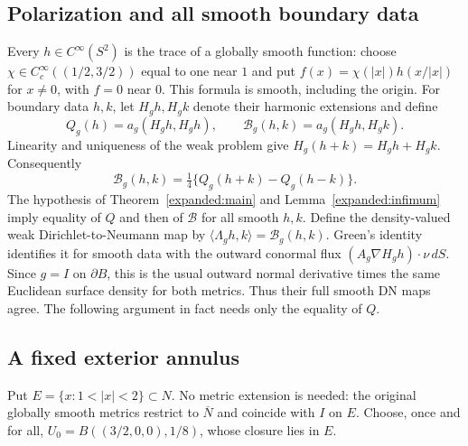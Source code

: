 \documentclass[11pt]{article}
\theoremstyle{definition}
\theoremstyle{remark}
\numberwithin{equation}{section}
\begin{document}
\subsection{Polarization and all smooth boundary data}
Every $h\in C^\infty(S^2)$ is the trace of a globally smooth function:
choose $\chi\in C_c^\infty((1/2,3/2))$ equal to one near $1$ and put
$f(x)=\chi(|x|)h(x/|x|)$ for $x\ne0$, with $f=0$ near $0$.
This formula is smooth, including the origin. For boundary data $h,k$,
let $H_gh,H_gk$ denote their harmonic extensions and define
\[
 Q_g(h)=a_g(H_gh,H_gh),\qquad
 \mathcal B_g(h,k)=a_g(H_gh,H_gk).
\]
Linearity and uniqueness of the weak problem give
$H_g(h+k)=H_gh+H_gk$. Consequently
\begin{equation}\label{expanded:polarization}
 \mathcal B_g(h,k)=\tfrac14\{Q_g(h+k)-Q_g(h-k)\}.
\end{equation}
The hypothesis of Theorem~\ref{expanded:main} and
Lemma~\ref{expanded:infimum} imply equality of $Q$ and then of
$\mathcal B$ for all smooth $h,k$. Define the density-valued weak
Dirichlet-to-Neumann map by
$\langle\Lambda_gh,k\rangle=\mathcal B_g(h,k)$.
Green's identity identifies it for smooth data with the outward conormal
flux $(A_g\nabla H_gh)\cdot\nu\,dS$. Since $g=I$ on $\partial B$,
this is the usual outward normal derivative times the same Euclidean
surface density for both metrics. Thus their full smooth DN maps agree.
The following argument in fact needs only the equality of $Q$.

\subsection{A fixed exterior annulus}\label{expanded:cap}
Put $E=\{x:1<|x|<2\}\subset N$. No metric extension is needed:
the original globally smooth metrics restrict to $\overline N$ and
coincide with $I$ on $E$. Choose, once and for all,
$U_0=B((3/2,0,0),1/8)$, whose closure lies in $E$.
\end{document}
